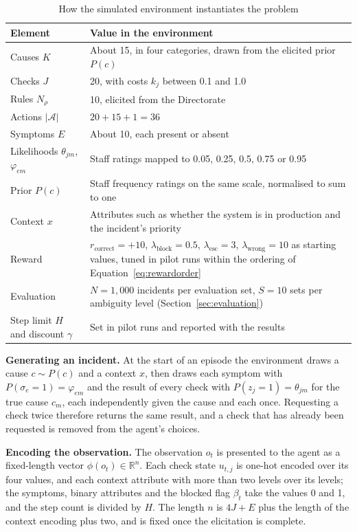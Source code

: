 \begin{table}[H]
\centering
\caption{How the simulated environment instantiates the problem}
\label{tab:instance}
\small
\begin{tabular}{|p{4.0cm}|p{10.6cm}|}
\hline
\textbf{Element} & \textbf{Value in the environment} \\ \hline
Causes $K$ & About 15, in four categories, drawn from the elicited prior $P(c)$ \\ \hline
Checks $J$ & 20, with costs $k_j$ between 0.1 and 1.0 \\ \hline
Rules $N_\rho$ & 10, elicited from the Directorate \\ \hline
Actions $|\mathcal{A}|$ & $20 + 15 + 1 = 36$ \\ \hline
Symptoms $E$ & About 10, each present or absent \\ \hline
Likelihoods $\theta_{jm}$, $\varphi_{em}$ & Staff ratings mapped to 0.05, 0.25, 0.5, 0.75 or 0.95 \\ \hline
Prior $P(c)$ & Staff frequency ratings on the same scale, normalised to sum to one \\ \hline
Context $x$ & Attributes such as whether the system is in production and the incident's priority \\ \hline
Reward & $r_{\text{correct}} = +10$, $\lambda_{\text{block}} = 0.5$, $\lambda_{\text{esc}} = 3$, $\lambda_{\text{wrong}} = 10$ as starting values, tuned in pilot runs within the ordering of Equation~\eqref{eq:rewardorder} \\ \hline
Evaluation & $N = 1{,}000$ incidents per evaluation set, $S = 10$ sets per ambiguity level (Section~\ref{sec:evaluation}) \\ \hline
Step limit $H$ and discount $\gamma$ & Set in pilot runs and reported with the results \\ \hline
\end{tabular}
\end{table}

\textbf{Generating an incident.} At the start of an episode the environment draws a cause $c \sim P(c)$ and a context $x$, then draws each symptom with $P(\sigma_e = 1) = \varphi_{em}$ and the result of every check with $P(z_j = 1) = \theta_{jm}$ for the true cause $c_m$, each independently given the cause and each once. Requesting a check twice therefore returns the same result, and a check that has already been requested is removed from the agent's choices.

\textbf{Encoding the observation.} The observation $o_t$ is presented to the agent as a fixed-length vector $\phi(o_t) \in \mathbb{R}^{n}$. Each check state $u_{t,j}$ is one-hot encoded over its four values, and each context attribute with more than two levels over its levels; the symptoms, binary attributes and the blocked flag $\beta_t$ take the values 0 and 1, and the step count is divided by $H$. The length $n$ is $4J + E$ plus the length of the context encoding plus two, and is fixed once the elicitation is complete.

